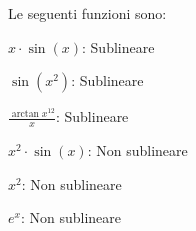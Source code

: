 \begin{example}
	Le seguenti funzioni sono:
	\begin{itemize}
		\begin{minipage}{0.49\linewidth}
			\item $x\cdot \sin(x)$: Sublineare
			\item $\sin(x^2)$: Sublineare
			\item $\frac{\arctan x^{12}}{x}$: Sublineare
		\end{minipage}
		\begin{minipage}{0.49\linewidth}
			\item $x^2\cdot \sin(x)$: Non sublineare
			\item $x^2$: Non sublineare
			\item $e^x$: Non sublineare
		\end{minipage}
	\end{itemize}
\end{example}

